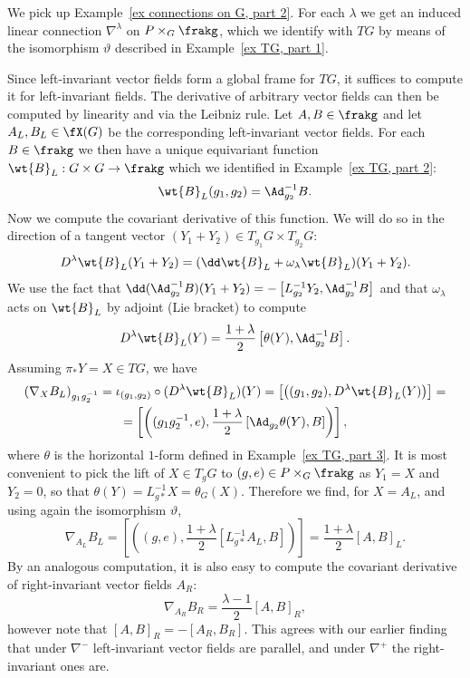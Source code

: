 \begin{example}\label{ex connections on G, part 3}
    We pick up Example~\ref{ex connections on G, part 2}. For each $\lambda$ we get an induced linear connection $\nabla^\lambda$ on $P\times_G \frakg$, which we identify with $TG$ by means of the isomorphism $\vartheta$ described in Example~\ref{ex TG, part 1}. 

    Since left-invariant vector fields form a global frame for $TG$, it suffices to compute it for left-invariant fields. The derivative of arbitrary vector fields can then be computed by linearity and via the Leibniz rule. Let $A,B\in\frakg$ and let $A_L,B_L\in\fX(G)$ be the corresponding left-invariant vector fields. 
    For each $B\in\frakg$ we then have a unique equivariant function $\wt{B}_L:G\times G\to \frakg$ which we identified in Example~\ref{ex TG, part 2}:
    \[
        \wt{B}_L(g_1,g_2)=\Ad_{g_2}^{-1}B.
    \]
    Now we compute the covariant derivative of this function. We will do so in the direction of a tangent vector $(Y_1+Y_2)\in T_{g_1}G\times T_{g_2}G$:
    \[D^\lambda \wt{B}_L(Y_1+Y_2)=(\dd\wt{B}_L+\omega_\lambda \wt{B}_L)(Y_1+Y_2).\]
    We use the fact that $\dd (\Ad_{g_2}^{-1} B)(Y_1+Y_2)=-\left[ L_{g_2}^{-1}Y_2,\Ad_{g_2}^{-1}B\right]$ and that $\omega_\lambda$ acts on $\wt{B}_L$ by adjoint (Lie bracket) to compute
    \[D^\lambda \wt{B}_L(Y)=\frac{1+\lambda}{2}\left[\theta(Y),\Ad_{g_2}^{-1}B\right].\]
    Assuming $\pi_\ast Y=X\in TG$, we have
    \begin{multline}
        \left( \nabla_X B_L \right)_{g_1g_2^{-1}}=\iota_{(g_1,g_2)}\circ (D^\lambda \wt{B}_L)(Y)=\left[\left( (g_1,g_2),D^\lambda \wt{B}_L(Y) \right)\right]=\\=\left[\left( (g_1g_2^{-1},e),\frac{1+\lambda}{2}\left[\Ad_{g_2}\theta(Y),B\right]\right)\right],
    \end{multline}
    where $\theta$ is the horizontal $1$-form defined in Example~\ref{ex TG, part 3}.
    It is most convenient to pick the lift of $X\in T_g G$ to $(g,e)\in P\times_G \frakg$ as $Y_1=X$ and $Y_2=0$, so that $\theta(Y)=L_{g\ast}^{-1}X=\theta_G(X)$. Therefore we find, for $X=A_L$, and using again the isomorphism $\vartheta$,
    \[\nabla_{A_L}B_L=\left[\left( (g,e),\frac{1+\lambda}{2}[L_{g\ast}^{-1}A_L,B] \right)\right]=\frac{1+\lambda}{2}[A,B]_L.\]
    By an analogous computation, it is also easy to compute the covariant derivative of right-invariant vector fields $A_R$:
    \[\nabla_{A_R}B_R=\frac{\lambda-1}{2}[A,B]_R,\]
    however note that $[A,B]_R=-[A_R,B_R]$. This agrees with our earlier finding that under $\nabla^-$ left-invariant vector fields are parallel, and under $\nabla^+$ the right-invariant ones are.  
    

\end{example}
